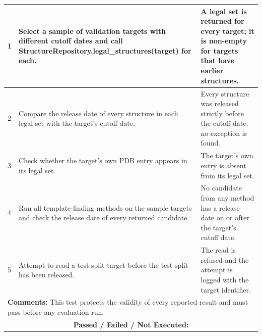 \documentclass{FastFyp}
\begin{document}
{\begin{longtable}{|p{2.4cm}|p{4.6cm}|p{2.4cm}|p{3.8cm}|}
1 & Select a sample of validation targets with different cutoff dates and call StructureRepository.legal\_structures(target) for each. & \multicolumn{2}{p{6.64cm}|}{A legal set is returned for every target; it is non-empty for targets that have earlier structures.} \\ \hline
2 & Compare the release date of every structure in each legal set with the target's cutoff date. & \multicolumn{2}{p{6.64cm}|}{Every structure was released strictly before the cutoff date; no exception is found.} \\ \hline
3 & Check whether the target's own PDB entry appears in its legal set. & \multicolumn{2}{p{6.64cm}|}{The target's own entry is absent from its legal set.} \\ \hline
4 & Run all template-finding methods on the sample targets and check the release date of every returned candidate. & \multicolumn{2}{p{6.64cm}|}{No candidate from any method has a release date on or after the target's cutoff date.} \\ \hline
5 & Attempt to read a test-split target before the test split has been released. & \multicolumn{2}{p{6.64cm}|}{The read is refused and the attempt is logged with the target identifier.} \\ \hline
\multicolumn{4}{|p{14.51cm}|}{\textbf{Comments:} This test protects the validity of every reported result and must pass before any evaluation run.} \\ \hline
\multicolumn{4}{|c|}{\textbf{Passed / Failed / Not Executed:}} \\ \hline
\end{longtable}
}
\end{document}
